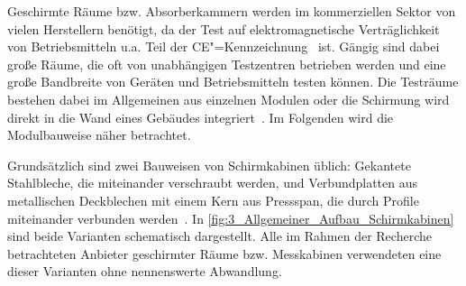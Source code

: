 

Geschirmte Räume bzw. Absorberkammern werden im kommerziellen Sektor von vielen Herstellern benötigt, da der Test auf elektromagnetische Verträglichkeit von Betriebsmitteln u.a. Teil der CE"=Kennzeichnung~\cite{Richtlinie_2014/30/EU} ist. Gängig sind dabei große Räume, die oft von unabhängigen Testzentren betrieben werden und eine große Bandbreite von Geräten und Betriebsmitteln testen können. Die Testräume bestehen dabei im Allgemeinen aus einzelnen Modulen oder die Schirmung wird direkt in die Wand eines Gebäudes integriert~\cite{EM_Schirmung}. Im Folgenden wird die Modulbauweise näher betrachtet.
\par
\vspace{\linespace}
Grundsätzlich sind zwei Bauweisen von Schirmkabinen üblich: Gekantete Stahlbleche, die miteinander verschraubt werden, und Verbundplatten aus metallischen Deckblechen mit einem Kern aus Pressspan, die durch Profile miteinander verbunden werden~\cite{EM_Schirmung, Design_of_shielded_enclosures}. In \Abb\ref{fig:3_Allgemeiner_Aufbau_Schirmkabinen} sind beide Varianten schematisch dargestellt. Alle im Rahmen der Recherche betrachteten Anbieter geschirmter Räume bzw. Messkabinen verwendeten eine dieser Varianten ohne nennenswerte Abwandlung.


